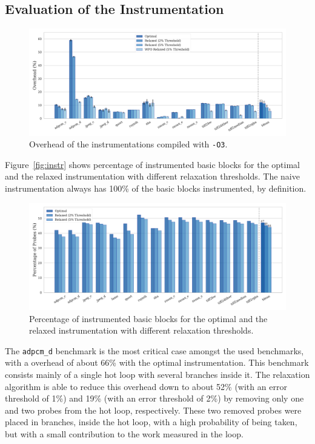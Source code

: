 \documentclass[sigplan,10pt]{acmart}
\theoremstyle{definition}
\begin{document}
\subsection{Evaluation of the Instrumentation}

\begin{figure}[htp]
    \centering
    \includegraphics[width=\textwidth]{figs/overhead-O3.pdf}
    \caption{Overhead of the instrumentations compiled with {\texttt{-O3}}.}
    \label{fig:overhead-O3}
\end{figure}

Figure~\ref{fig:instr} shows percentage of instrumented basic blocks for the optimal and the relaxed instrumentation with different relaxation thresholds.
The naive instrumentation always has 100\% of the basic blocks instrumented, by definition.

\begin{figure}[htp]
    \centering
    \includegraphics[width=\textwidth]{figs/num-probes.pdf}
    \caption{Percentage of instrumented basic blocks for the optimal and the relaxed instrumentation with different relaxation thresholds.}
    \label{fig:num-probes}
\end{figure}

The \texttt{adpcm\_d} benchmark is the most critical case amongst the used benchmarks, with a overhead of about 66\% with the optimal instrumentation.
This benchmark consists mainly of a single hot loop with several branches inside it.
The relaxation algorithm is able to reduce this overhead down to about 52\% (with an error threshold of 1\%) and 19\% (with an error threshold of 2\%) by removing only one and two probes from the hot loop, respectively.
These two removed probes were placed in branches, inside the hot loop, with a high probability of being taken, but with a small contribution to the work measured in the loop.
\end{document}
